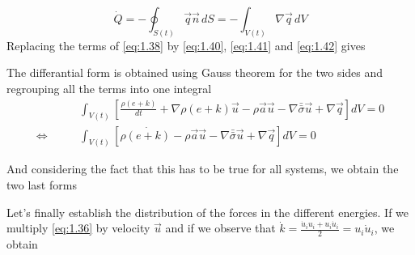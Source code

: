 		\begin{equation}
			\dot{Q} =  - \oint _{S(t)} \vec{q} \vec{n} \, dS = - \int _{V(t)} \nabla \vec{q} \, dV
			\label{eq:1.42}
		\end{equation}
		Replacing the terms of \eqref{eq:1.38} by \eqref{eq:1.40}, \eqref{eq:1.41} and \eqref{eq:1.42} gives 
		\begin{center}
		\end{center}
		
		The differantial form is obtained using Gauss theorem for the two sides and regrouping all the terms into one integral
		\begin{equation}
		\begin{aligned}
			&\int _{V(t)} \left[\frac{\rho (e+k)}{dt} + \nabla \rho (e+k)\vec{u} - \rho \vec{a} \vec{u} - \nabla \bar{\bar{\sigma}}\vec{u} + \nabla \vec{q} \right] dV = 0 \\
			\Leftrightarrow \qquad &\int _{V(t)} \left[\rho\dot{(e+k)} - \rho \vec{a} \vec{u} - \nabla \bar{\bar{\sigma}}\vec{u} + \nabla \vec{q} \right] dV = 0
		\end{aligned}
		\end{equation}
		
		And considering the fact that this has to be true for all systems, we obtain the two last forms
		\begin{center}
		\end{center}
		\begin{center}
		\end{center}
		Let's finally establish the distribution of the forces in the different energies. If we multiply \eqref{eq:1.36} by velocity $\vec{u}$ and if we observe that $\dot{k} = \frac{\dot{u}_i u_i+u_i\dot{u}_i}{2} = u_i \dot{u}_i$, we obtain 
		
